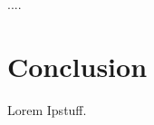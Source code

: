 \documentclass[a4paper, 11pt]{article} %
\begin{document}

\begin{displayquote}
....
\end{displayquote}

\section*{Conclusion}
Lorem Ipstuff.







\end{document}
